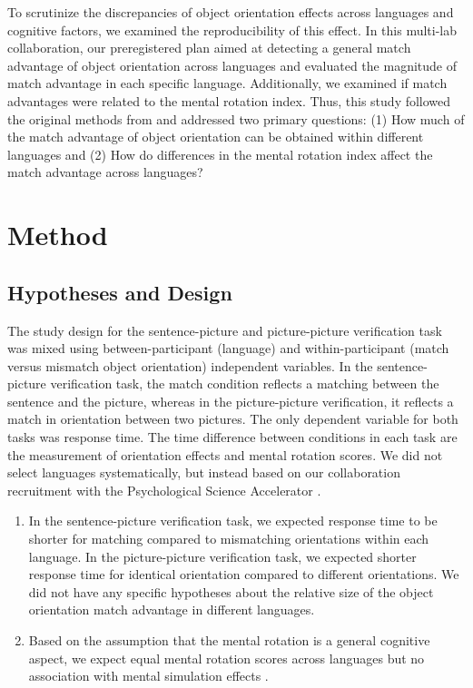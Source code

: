 \documentclass[
  man,floatsintext]{apa6}
\begin{document}
To scrutinize the discrepancies of object orientation effects across languages and cognitive factors, we examined the reproducibility of this effect. In this multi-lab collaboration, our preregistered plan aimed at detecting a general match advantage of object orientation across languages and evaluated the magnitude of match advantage in each specific language. Additionally, we examined if match advantages were related to the mental rotation index. Thus, this study followed the original methods from \textcite{stanfield_effect_2001} and addressed two primary questions: (1) How much of the match advantage of object orientation can be obtained within different languages and (2) How do differences in the mental rotation index affect the match advantage across languages?

\hypertarget{method}{%
\section{Method}\label{method}}

\hypertarget{hypotheses-and-design}{%
\subsection{Hypotheses and Design}\label{hypotheses-and-design}}

The study design for the sentence-picture and picture-picture verification task was mixed using between-participant (language) and within-participant (match versus mismatch object orientation) independent variables. In the sentence-picture verification task, the match condition reflects a matching between the sentence and the picture, whereas in the picture-picture verification, it reflects a match in orientation between two pictures. The only dependent variable for both tasks was response time. The time difference between conditions in each task are the measurement of orientation effects and mental rotation scores. We did not select languages systematically, but instead based on our collaboration recruitment with the Psychological Science Accelerator \autocite[PSA,][]{moshontzPsychologicalScienceAccelerator2018}.

\begin{enumerate}
\def\labelenumi{(\arabic{enumi})}
\item
  In the sentence-picture verification task, we expected response time to be shorter for matching compared to mismatching orientations within each language. In the picture-picture verification task, we expected shorter response time for identical orientation compared to different orientations. We did not have any specific hypotheses about the relative size of the object orientation match advantage in different languages.
\item
  Based on the assumption that the mental rotation is a general cognitive aspect, we expect equal mental rotation scores across languages but no association with mental simulation effects \autocite[see][]{chenDoesObjectSize2020}.
\end{enumerate}
\end{document}
